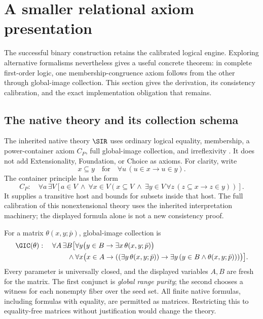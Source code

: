 \section{A smaller relational axiom presentation}
\label{sec:formalisms}

The successful binary construction retains the calibrated logical
engine. Exploring alternative formalisms nevertheless gives a
useful concrete theorem: in complete first-order logic, one
membership-congruence axiom follows from the other through
global-image collection. This section gives the derivation,
its consistency calibration, and the exact implementation
obligation that remains.

\subsection{The native theory and its collection schema}

The inherited native theory $\SIR$ uses ordinary logical equality,
membership, a power-container axiom $C_P$, full global-image
collection, and irreflexivity \cite{upstream,native}. It does not
add Extensionality, Foundation, or Choice as axioms.
For clarity, write
\[
 x\subseteq y\quad\text{for}\quad
 \forall u\,(u\in x\to u\in y).
\]
The container principle has the form
\[
 C_P:\quad
 \forall a\,\exists V\left[
 a\in V\ \land\
 \forall x\in V\left(
 x\subseteq V\ \land\
 \exists y\in V\,\forall z\,(z\subseteq x\to z\in y)
 \right)\right].
\]
It supplies a transitive host and bounds for subsets inside
that host. The full calibration of this nonextensional theory
uses the inherited interpretation machinery; the displayed
formula alone is not a new consistency proof.

For a matrix $\theta(x,y;\bar p)$, global-image collection is
\begin{align}
 \GIC(\theta):\quad
 \forall A\,\exists B\bigl[
 &\forall y\bigl(y\in B\to\exists x\,\theta(x,y;\bar p)\bigr)
 \notag\\
 {}\land{}&
 \forall x\bigl(x\in A\to
 ((\exists y\,\theta(x,y;\bar p))
 \to\exists y\,(y\in B\land\theta(x,y;\bar p)))\bigr)
 \bigr].
 \label{eq:gic}
\end{align}
Every parameter is universally closed, and the displayed
variables $A,B$ are fresh for the matrix. The first conjunct
is \emph{global range purity}; the second chooses a witness
for each nonempty fiber over the seed set.
All finite native formulas, including formulas with equality,
are permitted as matrices. Restricting this to equality-free
matrices without justification would change the theory.

